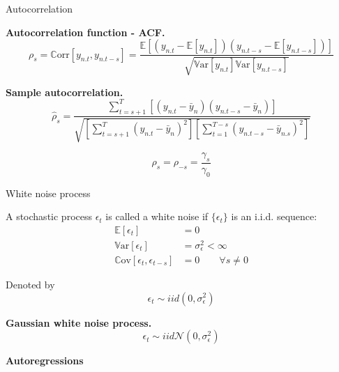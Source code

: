 \documentclass[notes,blackandwhite,mathsans]{beamer}
\begin{document}
\begin{frame}{Autocorrelation }


\textbf{Autocorrelation function - ACF.}
$$ \rho_s = \mathbb{C}\text{orr}[y_{n.t}, y_{n.t-s}] = \frac{\mathbb{E}\left[\left(y_{n.t} - \mathbb{E}[y_{n.t}]\right)\left(y_{n.t-s} - \mathbb{E}[y_{n.t-s}]\right)\right]}{\sqrt{ \mathbb{V}\text{ar}[y_{n.t}] \mathbb{V}\text{ar}[y_{n.t-s}] } }  $$

\bigskip\textbf{Sample autocorrelation.}
$$ \hat{\rho}_s = \frac{\sum_{t=s+1}^{T}[(y_{n.t} - \bar{y}_n)(y_{n.t-s} - \bar{y}_n)]}{\sqrt{\left[\sum_{t=s+1}^{T}(y_{n.t} - \bar{y}_n)^2 \right]\left[\sum_{t=1}^{T-s}(y_{n.t-s} - \bar{y}_{n.s})^2 \right]}} $$


$$\rho_s = \rho_{-s} = \frac{\gamma_s}{\gamma_0} $$


\end{frame}




\begin{frame}{White noise process}

{\color{mcxs2}A stochastic process} $\epsilon_t$ {\color{mcxs2}is called a} {\color{mcxs2}white noise} {\color{mcxs2}if} $\{\epsilon_t\}$ {\color{mcxs2}is an i.i.d. sequence:}
\begin{align*}
\mathbb{E}[\epsilon_t] &= 0 \\
\mathbb{V}\text{ar}[\epsilon_t] &= \sigma_{\epsilon}^2  < \infty \\
\mathbb{C}\text{ov}[\epsilon_t, \epsilon_{t-s}] &= 0 \qquad \forall s\neq0
\end{align*}

{\color{mcxs2}Denoted by}
$$ \epsilon_t \sim iid\left(0,\sigma_{\epsilon}^2 \right) $$

\bigskip\textbf{Gaussian white noise process.}
$$ \epsilon_t \sim iid\mathcal{N}\left(0,\sigma_{\epsilon}^2 \right) $$

\end{frame}








{
\begin{frame}

\begin{adjustwidth}{-0.5cm}{0cm}
\vspace{8.3cm}\Large
\textbf{{\color{mcxs2}Autoregressions} {\color{white}}}
\end{adjustwidth}

\end{frame}
}
\end{document}
